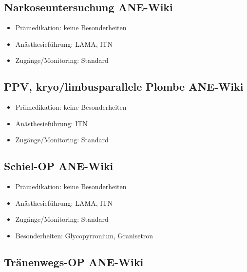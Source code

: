 \documentclass[
]{book}
\providecommand{\tightlist}{%
  \setlength{\itemsep}{0pt}\setlength{\parskip}{0pt}}
\begin{document}
\hypertarget{narkoseuntersuchung-ane-wiki}{%
\subsection{Narkoseuntersuchung ANE-Wiki}\label{narkoseuntersuchung-ane-wiki}}

\begin{itemize}
\tightlist
\item
  Prämedikation: keine Besonderheiten
\item
  Anästhesieführung: LAMA, ITN
\item
  Zugänge/Monitoring: Standard
\end{itemize}

\hypertarget{ppv-kryolimbusparallele-plombe-ane-wiki}{%
\subsection{PPV, kryo/limbusparallele Plombe ANE-Wiki}\label{ppv-kryolimbusparallele-plombe-ane-wiki}}

\begin{itemize}
\tightlist
\item
  Prämedikation: keine Besonderheiten
\item
  Anästhesieführung: ITN
\item
  Zugänge/Monitoring: Standard
\end{itemize}

\hypertarget{schiel-op-ane-wiki}{%
\subsection{Schiel-OP ANE-Wiki}\label{schiel-op-ane-wiki}}

\begin{itemize}
\tightlist
\item
  Prämedikation: keine Besonderheiten
\item
  Anästhesieführung: LAMA, ITN
\item
  Zugänge/Monitoring: Standard
\item
  Besonderheiten: Glycopyrronium, Granisetron
\end{itemize}

\hypertarget{truxe4nenwegs-op-ane-wiki}{%
\subsection{Tränenwegs-OP ANE-Wiki}\label{truxe4nenwegs-op-ane-wiki}}
\end{document}
